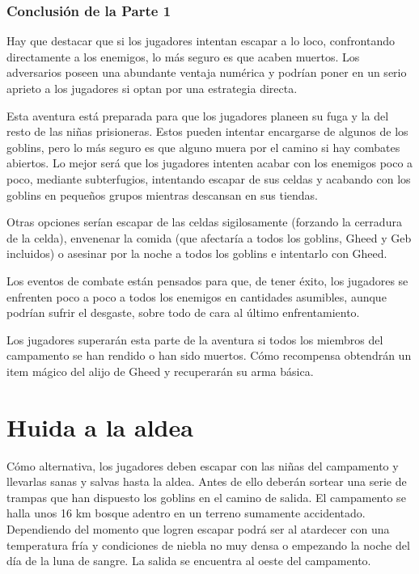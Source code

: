 \documentclass[10pt,twoside,twocolumn,openany]{dndbook}
\begin{document}
\section{Conclusión de la Parte 1}

Hay que destacar que si los jugadores intentan escapar a lo loco, confrontando directamente a los enemigos, lo más seguro es que acaben muertos. Los adversarios poseen una abundante ventaja numérica y podrían poner en un serio aprieto a los jugadores si optan por una estrategia directa.

Esta aventura está preparada para que los jugadores planeen su fuga y la del resto de las niñas prisioneras. Estos pueden intentar encargarse de algunos de los goblins, pero lo más seguro es que alguno muera por el camino si hay combates abiertos. Lo mejor será que los jugadores intenten acabar con los enemigos poco a poco, mediante subterfugios, intentando escapar de sus celdas y acabando con los goblins en pequeños grupos mientras descansan en sus tiendas.

Otras opciones serían escapar de las celdas sigilosamente (forzando la cerradura de la celda), envenenar la comida (que afectaría a todos los goblins, Gheed y Geb incluidos) o asesinar por la noche a todos los goblins e intentarlo con Gheed. 

Los eventos de combate están pensados para que, de tener éxito, los jugadores se enfrenten poco a poco a todos los enemigos en cantidades asumibles, aunque podrían sufrir el desgaste, sobre todo de cara al último enfrentamiento.

Los jugadores superarán esta parte de la aventura si todos los miembros del campamento se han rendido o han sido muertos. Cómo recompensa obtendrán un item mágico del alijo de Gheed y recuperarán su arma básica.


\part*{Huida a la aldea}

Cómo alternativa, los jugadores deben escapar con las niñas del campamento y llevarlas sanas y salvas hasta la aldea. Antes de ello deberán sortear una serie de trampas que han dispuesto los goblins en el camino de salida. El campamento se halla unos 16 km bosque adentro en un terreno sumamente accidentado. Dependiendo del momento que logren escapar podrá ser al atardecer con una temperatura fría y condiciones de niebla no muy densa o empezando la noche del día de la luna de sangre. La salida se encuentra al oeste del campamento.
\end{document}

